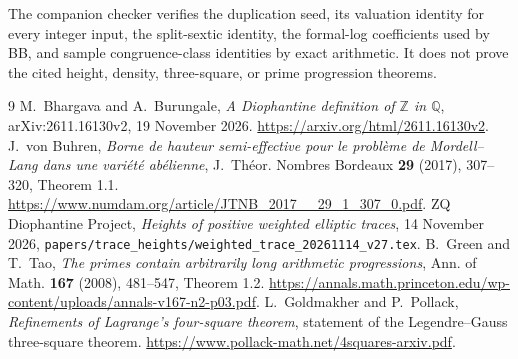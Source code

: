 \documentclass[11pt,a4paper]{article}
\newcommand{\Q}{\mathbb Q}\newcommand{\Z}{\mathbb Z}
\begin{document}
The companion checker verifies the duplication seed, its valuation
identity for every integer input, the split-sextic identity, the
formal-log coefficients used by BB, and sample congruence-class
identities by exact arithmetic. It does not prove the cited height,
density, three-square, or prime progression theorems.

\begin{thebibliography}{9}
 M.~Bhargava and A.~Burungale,
\emph{A Diophantine definition of $\Z$ in $\Q$},
arXiv:2611.16130v2, 19 November 2026.
\url{https://arxiv.org/html/2611.16130v2}.
 J.~von Buhren,
\emph{Borne de hauteur semi-effective pour le probl\`eme de
Mordell--Lang dans une vari\'et\'e ab\'elienne},
J.~Th\'eor. Nombres Bordeaux \textbf{29} (2017), 307--320,
Theorem 1.1.
\url{https://www.numdam.org/article/JTNB_2017__29_1_307_0.pdf}.
 ZQ Diophantine Project,
\emph{Heights of positive weighted elliptic traces}, 14 November 2026,
\nolinkurl{papers/trace_heights/weighted_trace_20261114_v27.tex}.
 B.~Green and T.~Tao,
\emph{The primes contain arbitrarily long arithmetic progressions},
Ann. of Math. \textbf{167} (2008), 481--547, Theorem 1.2.
\url{https://annals.math.princeton.edu/wp-content/uploads/annals-v167-n2-p03.pdf}.
 L.~Goldmakher and P.~Pollack,
\emph{Refinements of Lagrange's four-square theorem},
statement of the Legendre--Gauss three-square theorem.
\url{https://www.pollack-math.net/4squares-arxiv.pdf}.
\end{thebibliography}
\end{document}
